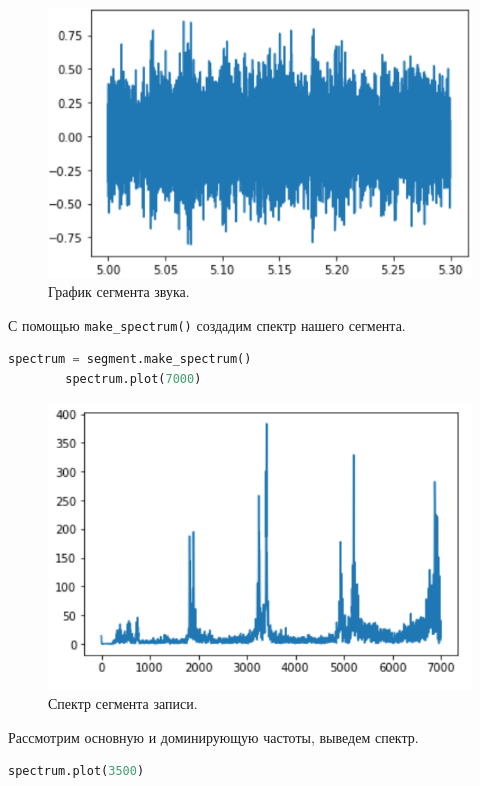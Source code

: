 \documentclass[a4paper, 14pt]{extarticle}
\begin{document}
    \begin{figure}[h]
        \centering
        \includegraphics[width=0.8\linewidth]{resources/Images/task2_wave_segment}
        \caption{График сегмента звука.}
        \label{fig:task2_wave_segment}
    \end{figure}

    С помощью \texttt{make\_spectrum()} создадим спектр нашего сегмента.

    \begin{lstlisting}[language=Python, caption= Создание спектра сегмента., label={lst:task2_spectrum}]
        spectrum = segment.make_spectrum()
        spectrum.plot(7000)
    \end{lstlisting}

    \begin{figure}[H]
        \centering
        \includegraphics[width=0.8\linewidth]{resources/Images/task2_spectrum}
        \caption{Спектр сегмента записи.}
        \label{fig:task2_spectrum}
    \end{figure}

    Рассмотрим основную и доминирующую частоты, выведем  спектр.

    \begin{lstlisting}[language=Python, caption= Создание спектра сегмента., label={lst:task2_small_spectrum}]
        spectrum.plot(3500)
    \end{lstlisting}
\end{document}
